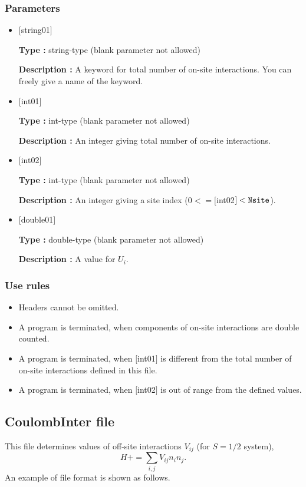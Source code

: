 \subsubsection{Parameters}
 \begin{itemize}

   \item  $[$string01$]$
   
    {\bf Type :} string-type (blank parameter not allowed)

   {\bf Description :} A keyword for total number of on-site interactions. You can freely give a name of the keyword.

   \item  $[$int01$]$
   
    {\bf Type :} int-type (blank parameter not allowed)

   {\bf Description :} An integer giving total number of on-site interactions.

  \item  $[$int02$]$
  
 {\bf Type :} int-type (blank parameter not allowed)

{\bf Description :} An integer giving a site index ($0<= [$int02$]<\verb|Nsite|$).
 
 \item  $[$double01$]$
   
   {\bf Type :} double-type (blank parameter not allowed)

  {\bf Description :}  A value for $U_i$.

\end{itemize}

\subsubsection{Use rules}
\begin{itemize}
\item Headers cannot be omitted. 
\item A program is terminated, when components of on-site interactions are double counted.
\item A program is terminated, when $[$int01$]$ is different from the total number of on-site interactions defined in this file.
\item A program is terminated, when $[$int02$]$ is out of range from the defined values.
\end{itemize}


\newpage
\subsection{CoulombInter file}
This file determines values of off-site interactions $V_{ij}$ {(for $S=1/2$ system)},
\begin{equation}
H+=\sum_{i,j}V_{ij} n_ {i}n_{j}.
\end{equation}
An example of file format is shown as follows.

